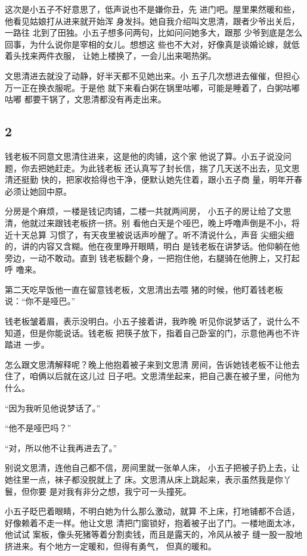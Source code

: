 这次是小五子不好意思了，低声说也不是嫌你丑，先
进门吧。屋里果然暖和些，他看见姑娘打从进来就开始浑
身发抖。她自我介绍叫文思清，跟者少爷出关后，一路往
北到了田独。小五子想多问两句，比如问问她多大，跟那
少爷到底是怎么回事，为什么说你是宰相的女儿。想想这
些也不大对，好像真是谈婚论嫁，就低着头找来两件衣服，
让她上楼换了，一会儿出来喝热粥。

文思清进去就没了动静，好半天都不见她出来。小
五子几次想进去催催，但担心万一正在换衣服呢。于是他
就下来看白粥在锅里咕嘟，可能是睡着了，白粥咕嘟咕嘟
都要干锅了，文思清都没有再走出来。
\newline

{\centering\subsection{2}}

钱老板不同意文思清住进来，这是他的肉铺，这个家
他说了算。小五子说没问题，你去把她赶走。为此钱老板
还认真写了封长信，揣了几天送不出去，见文思清还挺勤
快的，把家收拾得也干净，便默认她先住着，跟小五子商
量，明年开春必须让她回中原。

分房是个麻烦，一楼是钱记肉铺，二楼一共就两间房，
小五子的房让给了文思清，他就过来跟钱老板挤一挤。别
看他白天是个哑巴，晚上呼噜声倒是不小，将近十天总算
习惯了，有天夜里被说话声吵醒了。听不清说什么，声音
尖细尖细的，讲的内容又含糊。他在夜里睁开眼睛，明白
是钱老板在讲梦话。他仰躺在他旁边，一动不敢动。直到
钱老板翻个身，一把抱住他，右腿骑在他胯上，又打起呼
噜来。

第二天吃早饭他一直在留意钱老板，文思清出去喂
猪的时候，他盯着钱老板说：“你不是哑巴。”

钱老板皱着眉，表示没明白。小五子接着讲，我昨晚
听见你说梦话了，说什么不知道，但是你能说话。钱老板
把筷子放下，指着自己卧室的门，示意他再也不许踏进
一步。

怎么跟文思清解释呢？晚上他抱着被子来到文思清
房间，告诉她钱老板不让他去住了，咱俩以后就在这儿过
日子吧。文思清坐起来，把自己裹在被子里，问他为什么。

“因为我听见他说梦话了。”

“他不是哑巴吗？”

“对，所以他不让我再进去了。”

别说文思清，连他自己都不信，房间里就一张单人床，
小五子把被子扔上去，让她往里一点，袜子都没脱就上了
床。文思清从床上跳起来，表示虽然我是你丫鬟，但你要
是对我有非分之想，我宁可一头撞死。

小五子眨巴着眼睛，不明白她为什么那么激动，就算
不上床，打地铺都不合适，好像赖着不走一样。他让文思
清把门窗锁好，抱着被子出了门。一楼地面太冰，他试试
案板，像头死猪等着分割卖钱，而且是露天的，冷风从被子
缝一股一股地挤进来。有个地方一定暖和，但得有勇气，
但真的暖和。

